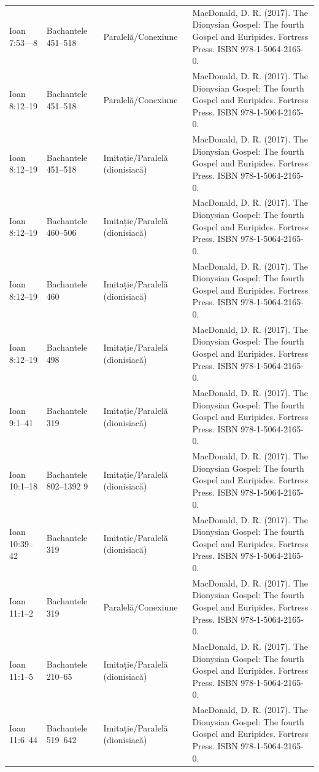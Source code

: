 \documentclass[12pt,a4paper,twoside,openany]{book}
\begin{document}
\begin{longtable}{L{1.4cm}L{1.7cm}L{3.1cm}L{8.4cm}}
Ioan 7:53—8 & Bachantele 451–518 & Paralelă/Conexiune & MacDonald, D. R. (2017). The Dionysian Gospel: The fourth Gospel and Euripides. Fortress Press. ISBN 978-1-5064-2165-0. \\
Ioan 8:12–19 & Bachantele 451–518 & Paralelă/Conexiune & MacDonald, D. R. (2017). The Dionysian Gospel: The fourth Gospel and Euripides. Fortress Press. ISBN 978-1-5064-2165-0. \\
Ioan 8:12–19 & Bachantele 451–518 & Imitație/Paralelă (dionisiacă) & MacDonald, D. R. (2017). The Dionysian Gospel: The fourth Gospel and Euripides. Fortress Press. ISBN 978-1-5064-2165-0. \\
Ioan 8:12–19 & Bachantele 460–506 & Imitație/Paralelă (dionisiacă) & MacDonald, D. R. (2017). The Dionysian Gospel: The fourth Gospel and Euripides. Fortress Press. ISBN 978-1-5064-2165-0. \\
Ioan 8:12–19 & Bachantele 460 & Imitație/Paralelă (dionisiacă) & MacDonald, D. R. (2017). The Dionysian Gospel: The fourth Gospel and Euripides. Fortress Press. ISBN 978-1-5064-2165-0. \\
Ioan 8:12–19 & Bachantele 498 & Imitație/Paralelă (dionisiacă) & MacDonald, D. R. (2017). The Dionysian Gospel: The fourth Gospel and Euripides. Fortress Press. ISBN 978-1-5064-2165-0. \\
Ioan 9:1–41 & Bachantele 319 & Imitație/Paralelă (dionisiacă) & MacDonald, D. R. (2017). The Dionysian Gospel: The fourth Gospel and Euripides. Fortress Press. ISBN 978-1-5064-2165-0. \\
Ioan 10:1–18 & Bachantele 802–1392 9 & Imitație/Paralelă (dionisiacă) & MacDonald, D. R. (2017). The Dionysian Gospel: The fourth Gospel and Euripides. Fortress Press. ISBN 978-1-5064-2165-0. \\
Ioan 10:39–42 & Bachantele 319 & Imitație/Paralelă (dionisiacă) & MacDonald, D. R. (2017). The Dionysian Gospel: The fourth Gospel and Euripides. Fortress Press. ISBN 978-1-5064-2165-0. \\
Ioan 11:1–2 & Bachantele 319 & Paralelă/Conexiune & MacDonald, D. R. (2017). The Dionysian Gospel: The fourth Gospel and Euripides. Fortress Press. ISBN 978-1-5064-2165-0. \\
Ioan 11:1–5 & Bachantele 210–65 & Imitație/Paralelă (dionisiacă) & MacDonald, D. R. (2017). The Dionysian Gospel: The fourth Gospel and Euripides. Fortress Press. ISBN 978-1-5064-2165-0. \\
Ioan 11:6–44 & Bachantele 519–642 & Imitație/Paralelă (dionisiacă) & MacDonald, D. R. (2017). The Dionysian Gospel: The fourth Gospel and Euripides. Fortress Press. ISBN 978-1-5064-2165-0. \\

\end{longtable}
\end{document}

